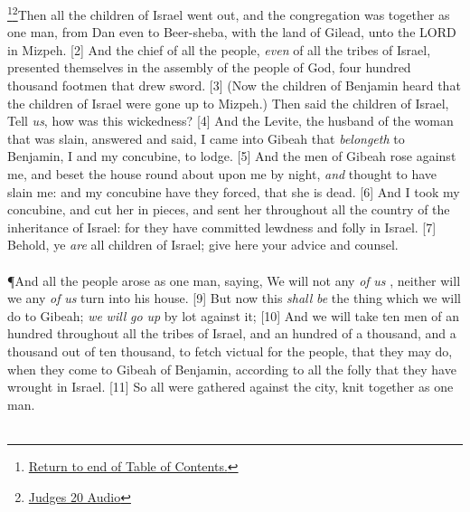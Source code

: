 \footnote{\textcolor[cmyk]{0.99998,1,0,0}{\hyperlink{TOC}{Return to end of Table of Contents.}}}\footnote{\href{https://audiobible.com/bible/judges_20.html}{\textcolor[cmyk]{0.99998,1,0,0}{Judges 20 Audio}}}\textcolor[cmyk]{0.99998,1,0,0}{Then all the children of Israel went out, and the congregation was  together as one man, from Dan even to Beer-sheba, with the land of Gilead, unto the LORD in Mizpeh.}
[2] \textcolor[cmyk]{0.99998,1,0,0}{And the chief of all the people, \emph{even} of all the tribes of Israel, presented themselves in the assembly of the people of God, four hundred thousand footmen that drew sword.}
[3] \textcolor[cmyk]{0.99998,1,0,0}{(Now the children of Benjamin heard that the children of Israel were gone up to Mizpeh.) Then said the children of Israel, Tell \emph{us}, how was this wickedness?}
[4] \textcolor[cmyk]{0.99998,1,0,0}{And the Levite, the husband of the woman that was slain, answered and said, I came into Gibeah that \emph{belongeth} to Benjamin, I and my concubine, to lodge.}
[5] \textcolor[cmyk]{0.99998,1,0,0}{And the men of Gibeah rose against me, and beset the house round about upon me by night, \emph{and} thought to have slain me: and my concubine have they forced, that she is dead.}
[6] \textcolor[cmyk]{0.99998,1,0,0}{And I took my concubine, and cut her in pieces, and sent her throughout all the country of the inheritance of Israel: for they have committed lewdness and folly in Israel.}
[7] \textcolor[cmyk]{0.99998,1,0,0}{Behold, ye \emph{are} all children of Israel; give here your advice and counsel.}\\
\\
\P \textcolor[cmyk]{0.99998,1,0,0}{And all the people arose as one man, saying, We will not any \emph{of} \emph{us} , neither will we any \emph{of} \emph{us} turn into his house.}
[9] \textcolor[cmyk]{0.99998,1,0,0}{But now this \emph{shall} \emph{be} the thing which we will do to Gibeah; \emph{we} \emph{will} \emph{go} \emph{up} by lot against it;}
[10] \textcolor[cmyk]{0.99998,1,0,0}{And we will take ten men of an hundred throughout all the tribes of Israel, and an hundred of a thousand, and a thousand out of ten thousand, to fetch victual for the people, that they may do, when they come to Gibeah of Benjamin, according to all the folly that they have wrought in Israel.}
[11] \textcolor[cmyk]{0.99998,1,0,0}{So all  were gathered against the city, knit together as one man.}\\
\\
